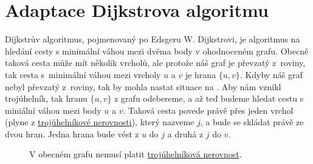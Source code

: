 \section{Adaptace Dijkstrova algoritmu}
\label{sec:dijkstra}

Dijkstrův algoritmus, pojmenovaný po Edsgeru W. Dijkstrovi, je algoritmus na hledání cesty s minimální váhou mezi dvěma body v ohodnoceném grafu. Obecně taková cesta může mít několik vrcholů, ale protože náš graf je převzatý z~roviny, tak cesta s~minimální váhou mezi vrcholy $u$ a $v$ je hrana $\{u, v\}$. Kdyby náš graf nebyl převzatý z~roviny, tak by mohla nastat situace na . Aby nám vznikl trojúhelník, tak hranu $\{u, v\}$ z grafu odebereme, a až teď budeme hledat cestu s miniální váhou mezi body $u$ a $v$. Taková cesta povede právě přes jeden vrchol (plyne z \hyperref[definice:trojuhelnikova_nerovnost]{trojúhelníkové nerovnosti}), který nazveme $j$, a bude se skládat právě ze dvou hran. Jedna hrana bude vést z $u$ do $j$ a druhá z $j$ do $v$. 



\begin{figure}[ht]

    \centering
    \caption{V obecném grafu nemusí platit \hyperref[definice:trojuhelnikova_nerovnost]{trojúhelníková nerovnost}.}
    \label{obr:troj_ner_graf}
\end{figure}




